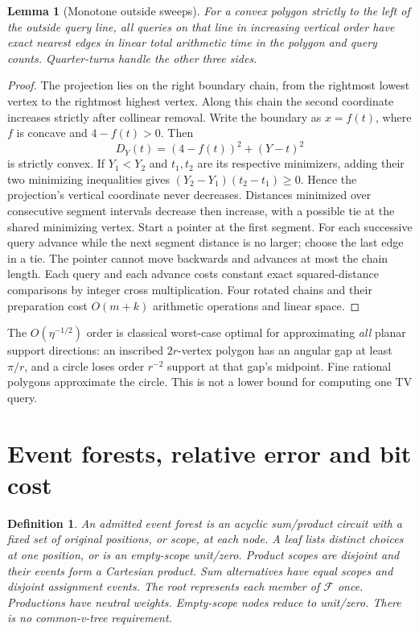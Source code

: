 \documentclass[11pt]{article}
\newtheorem{lemma}{Lemma}
\newtheorem{definition}{Definition}
\begin{document}
\begin{lemma}[Monotone outside sweeps]\label{lem:query}
For a convex polygon strictly to the left of the outside query line, all
queries on that line in increasing vertical order have exact nearest edges
in linear total arithmetic time in the polygon and query counts.
Quarter-turns handle the other three sides.
\end{lemma}
\begin{proof}
The projection lies on the right boundary chain, from the rightmost
lowest vertex to the rightmost highest vertex. Along this chain the second
coordinate increases strictly after collinear removal. Write the boundary
as $x=f(t)$, where $f$ is concave and $4-f(t)>0$. Then
\[
D_Y(t)=(4-f(t))^2+(Y-t)^2
\]
is strictly convex. If $Y_1<Y_2$ and $t_1,t_2$ are its respective minimizers,
adding their two minimizing inequalities gives
$(Y_2-Y_1)(t_2-t_1)\geq0$. Hence the projection's vertical coordinate never
decreases. Distances minimized over consecutive segment intervals decrease
then increase, with a possible tie at the shared minimizing vertex.
Start a pointer at the first segment. For each successive query advance
while the next segment distance is no larger; choose the last edge in a tie.
The pointer cannot move backwards and advances at most the chain length.
Each query and each advance costs constant exact squared-distance comparisons
by integer cross multiplication. Four rotated chains and their preparation
cost $O(m+k)$ arithmetic operations and linear space.
\end{proof}

The $O(\eta^{-1/2})$ order is classical worst-case optimal for approximating
\emph{all} planar support directions: an inscribed $2r$-vertex polygon has
an angular gap at least $\pi/r$, and a circle loses order $r^{-2}$ support
at that gap's midpoint. Fine rational polygons approximate the circle.
This is not a lower bound for computing one TV query.

\section{Event forests, relative error and bit cost}
\begin{definition}
An admitted event forest is an acyclic sum/product circuit with a fixed set
of original positions, or scope, at each node. A leaf lists distinct choices
at one position, or is an empty-scope unit/zero. Product scopes are disjoint
and their events form a Cartesian product. Sum alternatives have equal scopes
and disjoint assignment events. The root represents each member of
$\mathcal F$ once. Productions have neutral weights. Empty-scope nodes reduce
to unit/zero. There is no common-v-tree requirement.
\end{definition}
\end{document}
